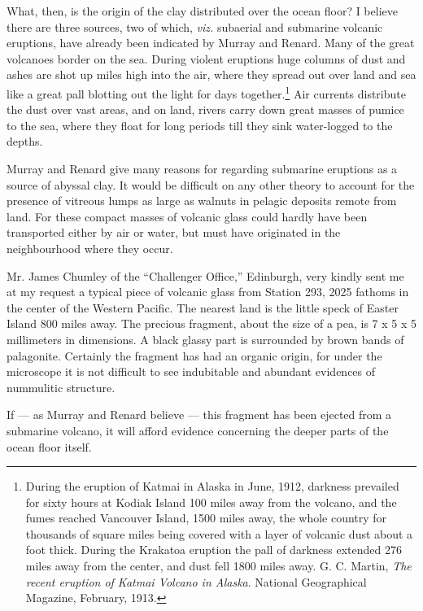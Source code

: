 \documentclass[a4paper, 12pt, oneside]{article}
\begin{document}
What, then, is the origin of the clay distributed over the ocean floor? I believe there are three sources, two of which, \emph{viz.} subaerial and submarine volcanic eruptions, have already been indicated by Murray and Renard. Many of the great volcanoes border on the sea. During violent eruptions huge columns of dust and ashes are shot up miles high into the air, where they spread out over land and sea like a great pall blotting out the light for days together.\footnote{During the eruption of Katmai in Alaska in June, 1912, darkness prevailed for sixty hours at Kodiak Island 100 miles away from the volcano, and the fumes reached Vancouver Island, 1500 miles away, the whole country for thousands of square miles being covered with a layer of volcanic dust about a foot thick. During the Krakatoa eruption the pall of darkness extended 276 miles away from the center, and dust fell 1800 miles away. G. C. Martin, \emph{The recent eruption of Katmai Volcano in Alaska}. National Geographical Magazine, February, 1913.} Air currents distribute the dust over vast areas, and on land, rivers carry down great masses of pumice to the sea, where they float for long periods till they sink water-logged to the depths.

Murray and Renard give many reasons for regarding submarine eruptions as a source of abyssal clay. It would be difficult on any other theory to account for the presence of vitreous lumps as large as walnuts in pelagic deposits remote from land. For these compact masses of volcanic glass could hardly have been transported either by air or water, but must have originated in the neighbourhood where they occur.

Mr. James Chumley of the ``Challenger Office,'' Edinburgh, very kindly sent me at my request a typical piece of volcanic glass from Station 293, 2025 fathoms in the center of the Western Pacific. The nearest land is the little speck of Easter Island 800 miles away. The precious fragment, about the size of a pea, is 7 x 5 x 5 millimeters in dimensions. A black glassy part is surrounded by brown bands of palagonite. Certainly the fragment has had an organic origin, for under the microscope it is not difficult to see indubitable and abundant evidences of nummulitic structure.

If --- as Murray and Renard believe --- this fragment has been ejected from a submarine volcano, it will afford evidence concerning the deeper parts of the ocean floor itself.
\end{document}
